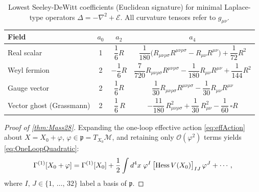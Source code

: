 \documentclass[pdflatex,sn-mathphys-num]{sn-jnl}
\theoremstyle{thmstyleone}
\theoremstyle{thmstylethree}%
\theoremstyle{thmstyletwo}%
\begin{document}
\begin{appendices}
\begin{table}[h]
\centering
\caption{Lowest Seeley-DeWitt coefficients (Euclidean signature)
for minimal Laplace-type operators
$\Delta=-\nabla^{2}+\mathcal E$.
All curvature tensors refer to $g_{\mu\nu}$.}
\label{tab:SDWcoeffs}
\renewcommand{\arraystretch}{1.5}
\begin{tabular}{lccc}
\hline
Field & $a_{0}$ & $a_{2}$ & $a_{4}$ \\
\hline
Real scalar & 
1 & 
$\dfrac{1}{6}R$ & 
\rule{0pt}{1.8em}%
$\dfrac{1}{180}\bigl(R_{\mu\nu\rho\sigma}R^{\mu\nu\rho\sigma}
          -R_{\mu\nu}R^{\mu\nu}\bigr)
    +\dfrac{1}{72}R^{2}$ \\

Weyl fermion & 
2 & 
$-\dfrac{1}{6}R$ & 
\rule{0pt}{2.2em}%
$\dfrac{7}{720}R_{\mu\nu\rho\sigma}R^{\mu\nu\rho\sigma}
   -\dfrac{1}{180}R_{\mu\nu}R^{\mu\nu}
   +\dfrac{1}{144}R^{2}$ \\

Gauge vector & 
2 & 
$\dfrac{1}{6}R$ & 
\rule{0pt}{2.2em}%
$\dfrac{1}{30}R_{\mu\nu\rho\sigma}R^{\mu\nu\rho\sigma}
   -\dfrac{1}{30}R_{\mu\nu}R^{\mu\nu}$ \\

Vector ghost (Grassmann) & 2 & $\,\dfrac16\,R$ & \rule{0pt}{2.2em} $-\dfrac{11}{180}\,R_{\mu\nu\rho\sigma}^{2}
          +\dfrac{1}{30}\,R_{\mu\nu}^{2}
          -\dfrac{1}{60}\,\square R$ \\[6pt]
\hline
\end{tabular}
\end{table}

\begin{proof}[Proof of \autoref{thm:Mass28}]
Expanding the one-loop effective action \eqref{eq:effAction} about
\(X=X_{0}+\varphi\), \(\varphi\in\mathfrak p=T_{X_{0}}\mathcal M\), and retaining
only \(\mathcal O(\varphi^{2})\) terms yields \eqref{eq:OneLoopQuadratic}:
\[
  \Gamma^{(1)}[X_{0}+\varphi]
  = \Gamma^{(1)}[X_{0}]
    + \frac12\int d^{4}x\;\varphi^{I}\,
      \bigl[\operatorname{Hess} V(X_{0})\bigr]_{IJ}\,
      \varphi^{J}
    + \cdots,
\]
where \(I,\,J\in\{1,\,\dots,\,32\}\) label a basis of \(\mathfrak p\).


\end{proof}
\end{appendices}
\end{document}
